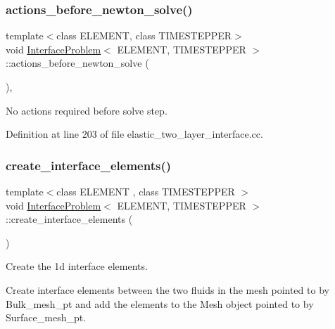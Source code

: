 \subsubsection{\texorpdfstring{actions\+\_\+before\+\_\+newton\+\_\+solve()}{actions\_before\_newton\_solve()}\hspace{0.1cm}{\footnotesize\ttfamily [2/2]}}
{\footnotesize\ttfamily template$<$class E\+L\+E\+M\+E\+NT, class T\+I\+M\+E\+S\+T\+E\+P\+P\+ER$>$ \\
void \hyperlink{classInterfaceProblem}{Interface\+Problem}$<$ E\+L\+E\+M\+E\+NT, T\+I\+M\+E\+S\+T\+E\+P\+P\+ER $>$\+::actions\+\_\+before\+\_\+newton\+\_\+solve (\begin{DoxyParamCaption}{ }\end{DoxyParamCaption})\hspace{0.3cm}{\ttfamily [inline]}, {\ttfamily [private]}}



No actions required before solve step. 



Definition at line 203 of file elastic\+\_\+two\+\_\+layer\+\_\+interface.\+cc.

\mbox{\label{classInterfaceProblem_a94e2cc71fe27c0c329030874e05734b8}} 
\subsubsection{\texorpdfstring{create\+\_\+interface\+\_\+elements()}{create\_interface\_elements()}}
{\footnotesize\ttfamily template$<$class E\+L\+E\+M\+E\+NT , class T\+I\+M\+E\+S\+T\+E\+P\+P\+ER $>$ \\
void \hyperlink{classInterfaceProblem}{Interface\+Problem}$<$ E\+L\+E\+M\+E\+NT, T\+I\+M\+E\+S\+T\+E\+P\+P\+ER $>$\+::create\+\_\+interface\+\_\+elements (\begin{DoxyParamCaption}{ }\end{DoxyParamCaption})\hspace{0.3cm}{\ttfamily [private]}}



Create the 1d interface elements. 

Create interface elements between the two fluids in the mesh pointed to by Bulk\+\_\+mesh\+\_\+pt and add the elements to the Mesh object pointed to by Surface\+\_\+mesh\+\_\+pt. 

